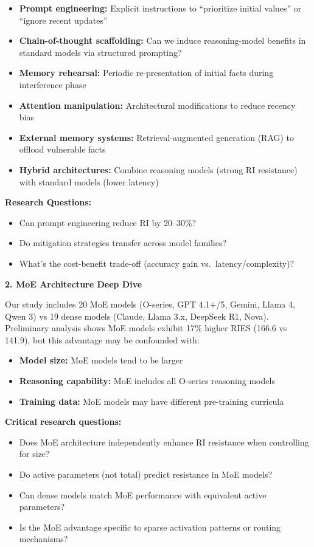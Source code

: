 \documentclass{article}
\begin{document}
\begin{itemize}[itemsep=2pt,topsep=3pt,parsep=0pt]
    \item \textbf{Prompt engineering:} Explicit instructions to ``prioritize initial values'' or ``ignore recent updates''
    \item \textbf{Chain-of-thought scaffolding:} Can we induce reasoning-model benefits in standard models via structured prompting?
    \item \textbf{Memory rehearsal:} Periodic re-presentation of initial facts during interference phase
    \item \textbf{Attention manipulation:} Architectural modifications to reduce recency bias
    \item \textbf{External memory systems:} Retrieval-augmented generation (RAG) to offload vulnerable facts
    \item \textbf{Hybrid architectures:} Combine reasoning models (strong RI resistance) with standard models (lower latency)
\end{itemize}

\textbf{Research Questions:}
\begin{itemize}[itemsep=2pt,topsep=3pt,parsep=0pt]
    \item Can prompt engineering reduce RI by 20--30\%?
    \item Do mitigation strategies transfer across model families?
    \item What's the cost-benefit trade-off (accuracy gain vs.\ latency/complexity)?
\end{itemize}

\textbf{2. MoE Architecture Deep Dive}

Our study includes 20 MoE models (O-series, GPT 4.1+/5, Gemini, Llama 4, Qwen 3) vs 19 dense models (Claude, Llama 3.x, DeepSeek R1, Nova). Preliminary analysis shows MoE models exhibit 17\% higher RIES (166.6 vs 141.9), but this advantage may be confounded with:
\begin{itemize}[itemsep=2pt,topsep=3pt,parsep=0pt]
    \item \textbf{Model size:} MoE models tend to be larger
    \item \textbf{Reasoning capability:} MoE includes all O-series reasoning models
    \item \textbf{Training data:} MoE models may have different pre-training curricula
\end{itemize}

\textbf{Critical research questions:}
\begin{itemize}[itemsep=2pt,topsep=3pt,parsep=0pt]
    \item Does MoE architecture independently enhance RI resistance when controlling for size?
    \item Do active parameters (not total) predict resistance in MoE models?
    \item Can dense models match MoE performance with equivalent active parameters?
    \item Is the MoE advantage specific to sparse activation patterns or routing mechanisms?
\end{itemize}
\end{document}
